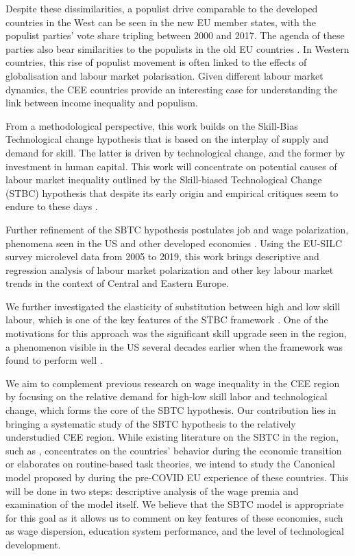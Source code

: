 \documentclass[11pt]{article}
\begin{document}
Despite these dissimilarities, a populist drive comparable to the developed countries in the West can be seen in the new EU member states, with the populist parties' vote share tripling between 2000 and 2017. The agenda of these parties also bear similarities to the populists in the old EU countries \citep{orenstein2022work}. In Western countries, this rise of populist movement is often linked to the effects of globalisation and labour market polarisation. Given different labour market dynamics, the CEE countries provide an interesting case for understanding the link between income inequality and populism. 



From a methodological perspective, this work builds on the Skill-Bias Technological change hypothesis \citep{katz1992changes} that is based on the interplay of supply and demand for skill. The latter is driven by technological change, and the former by investment in human capital. This work will concentrate on potential causes of labour market inequality outlined by the Skill-biased Technological Change (STBC) hypothesis that despite its early origin \citep{katz1992changes} and empirical critiques seem to endure to these days \citep{aziz2021between, goldin2020extending}.


Further refinement of the SBTC hypothesis postulates job and wage polarization, phenomena seen in the US and other developed economies \citep{rodrik2020economic, temin2018vanishing}. Using the EU-SILC survey microlevel data from 2005 to 2019, this work brings descriptive and regression analysis of labour market polarization and other key labour market trends in the context of Central and Eastern Europe.


We further investigated the elasticity of substitution between high and low skill labour, which is one of the key features of the STBC framework \citep{katz1992changes}. One of the motivations for this approach was the significant skill upgrade seen in the region, a phenomenon visible in the US several decades earlier when the framework was found to perform well \citep{hardy2018educational}.

We aim to complement previous research on wage inequality in the CEE region by focusing on the relative demand for high-low skill labor and technological change, which forms the core of the SBTC hypothesis. Our contribution lies in bringing a systematic study of the SBTC hypothesis to the relatively understudied CEE region. While existing literature on the SBTC in the region, such as \citet{tyrowicz2019wage}, concentrates on the countries' behavior during the economic transition or elaborates on routine-based task theories, we intend to study the Canonical model proposed by \citet{katz1992changes} during the pre-COVID EU experience of these countries. This will be done in two steps: descriptive analysis of the wage premia and examination of the model itself. We believe that the SBTC model is appropriate for this goal as it allows us to comment on key features of these economies, such as wage dispersion, education system performance, and the level of technological development.
\end{document}
